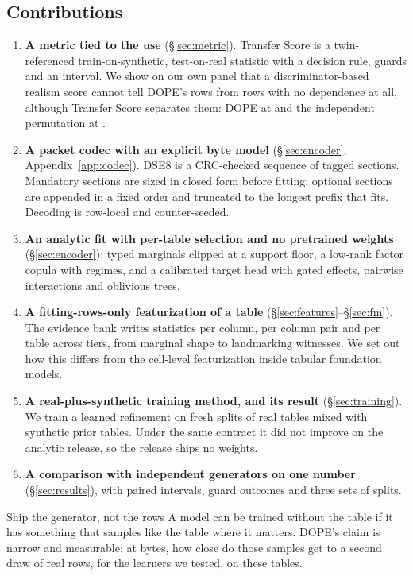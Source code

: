 \documentclass[10pt,letterpaper,twocolumn]{article}
\newcommand{\cli}[1]{{\ttfamily\fontsize{8.9}{11}\selectfont #1}}
\begin{document}
\subsection{Contributions}
\begin{enumerate}[leftmargin=1.45em,itemsep=3pt]
  \item \textbf{A metric tied to the use} (\S\ref{sec:metric}). Transfer Score is a twin-referenced train-on-synthetic, test-on-real statistic with a decision rule, guards and an interval. We show on our own panel that a discriminator-based realism score cannot tell DOPE's rows from rows with no dependence at all, although Transfer Score separates them: DOPE at  and the independent permutation at .
  \item \textbf{A packet codec with an explicit byte model} (\S\ref{sec:encoder}, Appendix~\ref{app:codec}). \cli{DSE8} is a CRC-checked sequence of tagged sections. Mandatory sections are sized in closed form before fitting; optional sections are appended in a fixed order and truncated to the longest prefix that fits. Decoding is row-local and counter-seeded.
  \item \textbf{An analytic fit with per-table selection and no pretrained weights} (\S\ref{sec:encoder}): typed marginals clipped at a support floor, a low-rank factor copula with regimes, and a calibrated target head with gated effects, pairwise interactions and oblivious trees.
  \item \textbf{A fitting-rows-only featurization of a table} (\S\ref{sec:features}--\S\ref{sec:fm}). The evidence bank writes  statistics per column,  per column pair and  per table across  tiers, from marginal shape to landmarking witnesses. We set out how this differs from the cell-level featurization inside tabular foundation models.
  \item \textbf{A real-plus-synthetic training method, and its result} (\S\ref{sec:training}). We train a learned refinement on fresh splits of real tables mixed with synthetic prior tables. Under the same contract it did not improve on the analytic release, so the release ships no weights.
  \item \textbf{A comparison with independent generators on one number} (\S\ref{sec:results}), with paired intervals, guard outcomes and three sets of splits.
\end{enumerate}

\begin{callout}{Ship the generator, not the rows}
A model can be trained without the table if it has something that samples like the table where it matters. DOPE's claim is narrow and measurable: at  bytes, how close do those samples get to a second draw of real rows, for the learners we tested, on these tables.
\end{callout}
\end{document}
